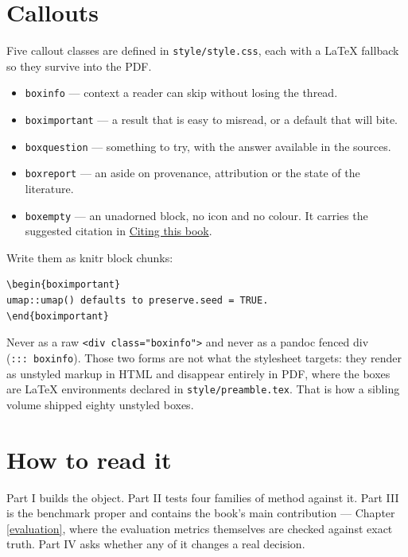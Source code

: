\documentclass[
  british,
  a4paper,
]{book}
\providecommand{\tightlist}{%
  \setlength{\itemsep}{0pt}\setlength{\parskip}{0pt}}
\newenvironment{boximportant}{\begin{quote}}{\end{quote}}
\begin{document}
\section*{Callouts}\label{callouts}

Five callout classes are defined in \texttt{style/style.css}, each with a LaTeX
fallback so they survive into the PDF.

\begin{itemize}
\tightlist
\item
  \texttt{boxinfo} --- context a reader can skip without losing the thread.
\item
  \texttt{boximportant} --- a result that is easy to misread, or a default that will bite.
\item
  \texttt{boxquestion} --- something to try, with the answer available in the sources.
\item
  \texttt{boxreport} --- an aside on provenance, attribution or the state of the
  literature.
\item
  \texttt{boxempty} --- an unadorned block, no icon and no colour. It carries the
  suggested citation in \hyperref[citing]{Citing this book}.
\end{itemize}

Write them as knitr block chunks:

\begin{verbatim}
\begin{boximportant}
umap::umap() defaults to preserve.seed = TRUE.
\end{boximportant}
\end{verbatim}

Never as a raw \texttt{\textless{}div\ class="boxinfo"\textgreater{}} and never as a pandoc fenced div
(\texttt{:::\ boxinfo}). Those two forms are not what the stylesheet targets: they
render as unstyled markup in HTML and disappear entirely in PDF, where the
boxes are LaTeX environments declared in \texttt{style/preamble.tex}. That is how a
sibling volume shipped eighty unstyled boxes.

\section*{How to read it}\label{how-to-read-it}

Part I builds the object. Part II tests four families of method against it.
Part III is the benchmark proper and contains the book's main contribution ---
Chapter \ref{evaluation}, where the evaluation metrics themselves are checked
against exact truth. Part IV asks whether any of it changes a real decision.
\end{document}
